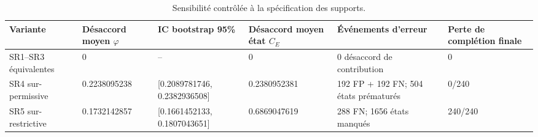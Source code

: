 \begin{table}[t]
\centering
\caption{Sensibilité contrôlée à la spécification des supports.}
\label{tab:v88-support-sensitivity}
\small
\begin{tabular}{p{}p{}p{}p{}p{}p{}}
\hline
Variante & Désaccord moyen $\varphi$ & IC bootstrap 95\% & Désaccord moyen état $C_E$ & Événements d'erreur & Perte de complétion finale \\
\hline
SR1--SR3 équivalentes & 0 & -- & 0 & 0 désaccord de contribution & 0 \\
SR4 sur-permissive & 0.2238095238 & [0.2089781746, 0.2382936508] & 0.2380952381 & 192 FP + 192 FN; 504 états prématurés & 0/240 \\
SR5 sur-restrictive & 0.1732142857 & [0.1661452133, 0.1807043651] & 0.6869047619 & 288 FN; 1656 états manqués & 240/240 \\
\hline
\end{tabular}
\end{table}
